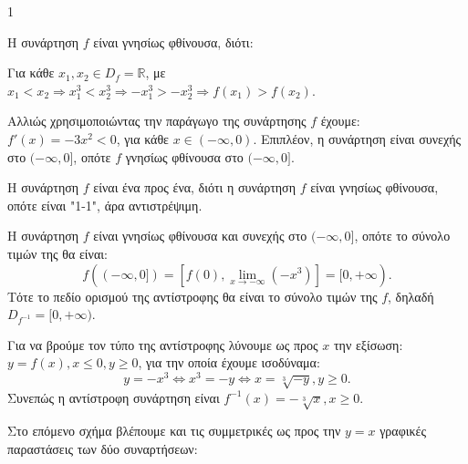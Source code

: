 \begin{ylh}{1}
    \item [Συνεχής συνάρτηση, Μονοτονία, Αντίστροφη Συνάρτηση]
\end{ylh}

\begin{figure}
\centering
{}
\end{figure}

\begin{alist}
\item Η συνάρτηση $f$ είναι γνησίως φθίνουσα, διότι:

Για κάθε $x_1, x_2 \in D_f=\mathbb{R}$, με $x_1<x_2 \Rightarrow x_1^3<x_2^3 \Rightarrow -x_1^3 > -x_2^3 \Rightarrow f(x_1) > f(x_2)$.

Αλλιώς χρησιμοποιώντας την παράγωγο της συνάρτησης $f$ έχουμε:
$f'(x) = -3x^2 < 0$, για κάθε $x \in (-\infty, 0)$. Επιπλέον, η συνάρτηση είναι συνεχής στο $(-\infty, 0]$, οπότε $f$ γνησίως φθίνουσα στο $(-\infty, 0]$.
\item Η συνάρτηση $f$ είναι ένα προς ένα, διότι η συνάρτηση $f$ είναι γνησίως φθίνουσα, οπότε είναι "1-1", άρα αντιστρέψιμη.

Η συνάρτηση $f$ είναι γνησίως φθίνουσα και συνεχής στο $(-\infty, 0]$, οπότε το σύνολο τιμών της θα είναι:
\[f((-\infty, 0]) = \left[f(0), \lim_{x \to -\infty} (-x^3)\right] = [0, +\infty).\]
Τότε το πεδίο ορισμού της αντίστροφης θα είναι το σύνολο τιμών της $f$, δηλαδή $D_{f^{-1}} = [0, +\infty)$.
\item Για να βρούμε τον τύπο της αντίστροφης λύνουμε ως προς $x$ την εξίσωση:
$y=f(x), x \le 0, y \ge 0$, για την οποία έχουμε ισοδύναμα:
\[y = -x^3 \Leftrightarrow x^3 = -y \Leftrightarrow x = \sqrt[3]{-y}, y \ge 0.\]
Συνεπώς η αντίστροφη συνάρτηση είναι $f^{-1}(x) = -\sqrt[3]{x}, x \ge 0$.

Στο επόμενο σχήμα βλέπουμε και τις συμμετρικές ως προς την $y=x$ γραφικές παραστάσεις των δύο συναρτήσεων:
\end{alist}